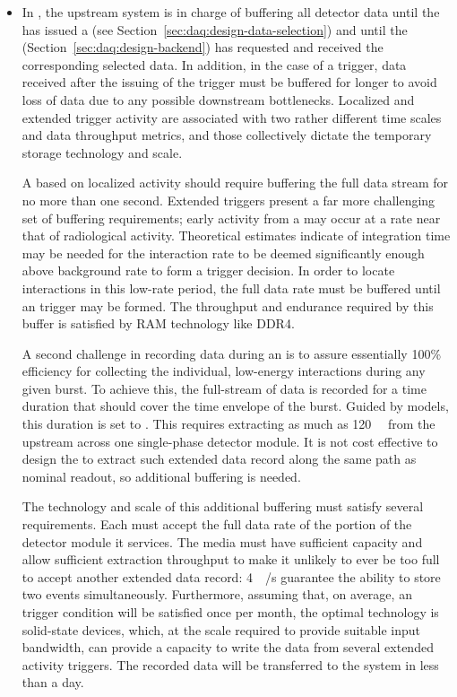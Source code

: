 \begin{itemize}
\item In , the upstream  system is in charge of buffering all
detector data until the  has issued a 
(see Section~\ref{sec:daq:design-data-selection}) and until the
 (Section~\ref{sec:daq:design-backend}) has requested
and received the corresponding selected data. 
In addition, in the case of a  trigger, data received after
the issuing of the trigger must be buffered for longer to
avoid loss of data due to any possible downstream
bottlenecks. Localized and extended trigger activity are associated
with two rather different time scales and data throughput metrics, and
those collectively dictate the temporary storage technology and scale. 

A  based on localized
activity should require buffering the full data stream for no more than one second.
Extended triggers present a far more challenging set of buffering
requirements; 
early activity from a  may occur at a rate near that of radiological activity.
Theoretical estimates indicate \snbpretime of integration time may be needed for the
 interaction rate to be deemed significantly enough above
background rate to form a trigger decision.
In order to locate interactions in this low-rate period, the full data rate must be buffered until an  trigger may be formed.
The throughput and endurance required by this buffer is satisfied by RAM technology like DDR4.

A second challenge in recording data during an  is to assure
essentially 100\% efficiency for collecting the individual, low-energy
interactions during any given  burst. 
To achieve this, the full-stream of data is recorded for a time duration that should cover the time envelope of the burst.
Guided by  models, this duration is set to \snbtime.
This requires extracting as much as \SI{120}{\tera\byte} from the  upstream  across one 
single-phase detector module.
It is not cost effective to design the  to extract such
extended data record along the same path as nominal readout, so
additional buffering is needed.

The technology and scale of this additional buffering must satisfy several requirements. 
Each  must accept the full data rate of the portion of the detector module it services.
The media must have sufficient capacity and allow sufficient extraction throughput to make it unlikely to ever be too full to accept another extended data record: \SI{4}{\tera\bit/\second} guarantee the ability to store two  events simultaneously.
Furthermore, assuming that, on average, an  trigger condition will be
satisfied once per month, the optimal technology is
solid-state  devices, which, at the scale required to provide suitable input bandwidth, can provide a capacity to write the data from several extended activity triggers. The recorded data will be transferred to the  system in less than a day.


\end{itemize}
